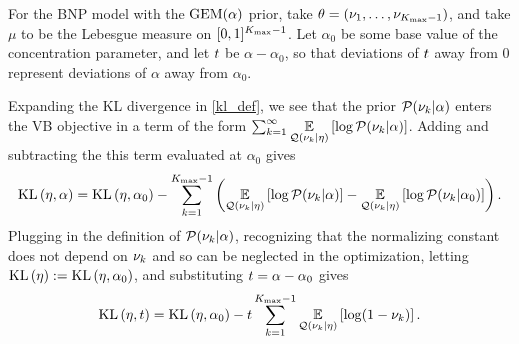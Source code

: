 \begin{ex}
%
For the BNP model with the $\mathrm{GEM}(\alpha)$ prior, take $\theta = (\nu_1, \ldots,
\nu_{{K_{\mathrm{max}}}-1})$, and take $\mu$ to be the Lebesgue measure on $[0,1]^{{K_{\mathrm{max}}}-1}$.
Let $\alpha_0$ be some base value of the concentration parameter, and
let $t$ be $\alpha - \alpha_0$, so that deviations of $t$ away from
$0$ represent deviations of $\alpha$ away from $\alpha_0$.

Expanding the KL divergence in \eqref{kl_def}, we see that the prior
$\mathcal{P}(\nu_{k} \vert \alpha)$ enters the VB objective in a term of the form
$\sum_{k=1}^\infty \underset{\mathcal{Q}(\nu_{k} \vert \eta)}{\mathbb{E}}\left[\log \mathcal{P}(\nu_{k} \vert \alpha)\right]$.
Adding and subtracting the this term evaluated at $\alpha_0$ gives
%
\begin{align*}
%
\KL{\eta, \alpha} = \KL{\eta, \alpha_0}
-\sum_{\k=1}^{\kmax - 1}
            \left(
                \expect{\q(\nuk \vert \eta)}{\log \p(\nuk \vert \alpha)} -
                \expect{\q(\nuk \vert \eta)}{\log \p(\nuk \vert \alpha_0)}
             \right).
%
\end{align*}
%
Plugging in the definition of $\mathcal{P}(\nu_{k} \vert \alpha)$, recognizing that the
normalizing constant does not depend on $\nu_{k}$ and so can be neglected in the
optimization, letting $\mathrm{KL}\left(\eta\right) := \mathrm{KL}\left(\eta, \alpha_0\right)$, and substituting $t =
\alpha - \alpha_0$ gives
%
\begin{align*}
%
\KL{\eta, \t} = \KL{\eta, \alpha_0}
-\t \sum_{\k=1}^{\kmax - 1}
    \expect{\q(\nuk \vert \eta)}{\log (1 - \nuk)}.
%
\end{align*}
%
\end{ex}




